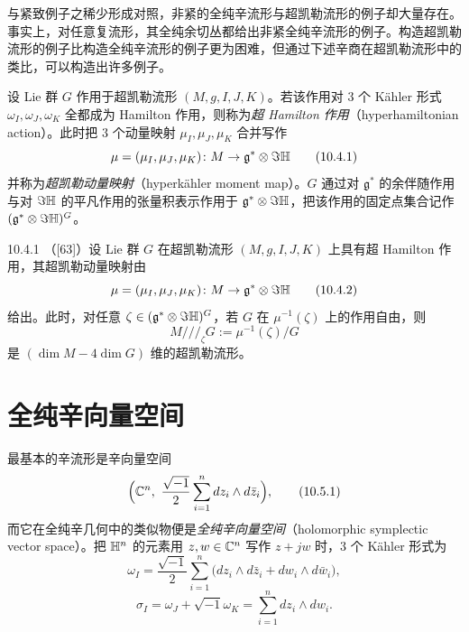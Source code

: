 与紧致例子之稀少形成对照，非紧的全纯辛流形与超凯勒流形的例子却大量存在。事实上，对任意复流形，其全纯余切丛都给出非紧全纯辛流形的例子。构造超凯勒流形的例子比构造全纯辛流形的例子更为困难，但通过下述辛商在超凯勒流形中的类比，可以构造出许多例子。

设 Lie 群 $G$ 作用于超凯勒流形 $(M,g,I,J,K)$。若该作用对 $3$ 个 Kähler 形式 $\omega_I,\omega_J,\omega_K$ 全都成为 Hamilton 作用，则称为\emph{超 Hamilton 作用}（hyperhamiltonian action）。此时把 $3$ 个动量映射 $\mu_I,\mu_J,\mu_K$ 合并写作
\begin{equation}
  \mu=(\mu_I,\mu_J,\mu_K)\colon M\to\mathfrak{g}^*\otimes\Im\mathbb{H} \tag{10.4.1}
\end{equation}
并称为\emph{超凯勒动量映射}（hyperkähler moment map）。$G$ 通过对 $\mathfrak{g}^*$ 的余伴随作用与对 $\Im\mathbb{H}$ 的平凡作用的张量积表示作用于 $\mathfrak{g}^*\otimes\Im\mathbb{H}$，把该作用的固定点集合记作 $(\mathfrak{g}^*\otimes\Im\mathbb{H})^G$。

\begin{theorem}{10.4.1}
  （[63]）设 Lie 群 $G$ 在超凯勒流形 $(M,g,I,J,K)$ 上具有超 Hamilton 作用，其超凯勒动量映射由
  \begin{equation}
    \mu=(\mu_I,\mu_J,\mu_K)\colon M\to\mathfrak{g}^*\otimes\Im\mathbb{H} \tag{10.4.2}
  \end{equation}
  给出。此时，对任意 $\zeta\in(\mathfrak{g}^*\otimes\Im\mathbb{H})^G$，若 $G$ 在 $\mu^{-1}(\zeta)$ 上的作用自由，则
  \begin{equation}
    M/\!/\!/_\zeta G:=\mu^{-1}(\zeta)/G \tag{10.4.3}
  \end{equation}
  是 $(\dim M-4\dim G)$ 维的超凯勒流形。
\end{theorem}



\section{全纯辛向量空间}

最基本的辛流形是辛向量空间
\begin{equation}
  \Bigl(\C^n,\ \frac{\sqrt{-1}}{2}\sum_{i=1}^n dz_i\wedge d\bar z_i\Bigr), \tag{10.5.1}
\end{equation}
而它在全纯辛几何中的类似物便是\emph{全纯辛向量空间}（holomorphic symplectic vector space）。把 $\mathbb{H}^n$ 的元素用 $z,w\in\mathbb{C}^n$ 写作 $z+jw$ 时，$3$ 个 Kähler 形式为
\begin{equation}
  \omega_I=\frac{\sqrt{-1}}{2}\sum_{i=1}^n\bigl(dz_i\wedge d\bar z_i+dw_i\wedge d\bar w_i\bigr), \tag{10.5.2}
\end{equation}
\begin{equation}
  \sigma_I=\omega_J+\sqrt{-1}\omega_K=\sum_{i=1}^n dz_i\wedge dw_i. \tag{10.5.3}
\end{equation}

